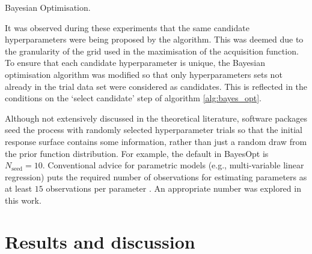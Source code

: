 \begin{algorithm}
\BlankLine
{}
\caption{Bayesian Optimisation.\label{alg:bayes_opt}}
\end{algorithm}

It was observed during these experiments that the same candidate hyperparameters were being proposed by the algorithm. This was deemed due to the granularity of the grid used in the maximisation of the acquisition function. To ensure that each candidate hyperparameter is unique, the Bayesian optimisation algorithm was modified so that only  hyperparameters sets not already in the trial data set were considered as candidates. This is reflected in the conditions on the `select candidate' step of algorithm \ref{alg:bayes_opt}.

Although not extensively discussed in the theoretical literature, software packages seed the process with randomly selected hyperparameter trials so that the initial response surface contains some information, rather than just a random draw from the prior function distribution. For example, the default in BayesOpt \cite{martinez-cantinBayesOptBayesianOptimization2014} is $N_{\mathrm{seed}} = 10$. Conventional advice  for parametric models (e.g., multi-variable linear regression) puts the required number of observations for estimating parameters as at least $15$ observations per parameter \cite{harrelRegressionModelingStrategies2015}. An appropriate number was explored in this work. 


\section{Results and discussion}\label{sec:msm_results}

